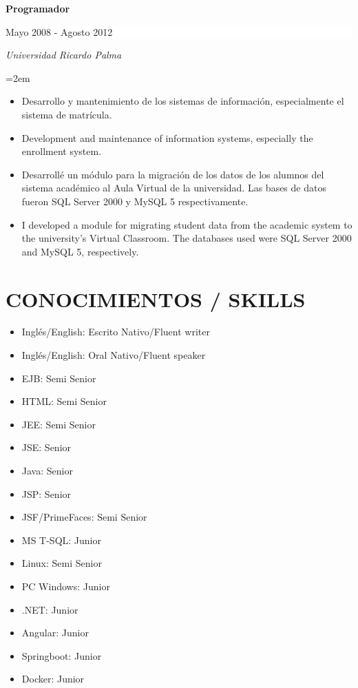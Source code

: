 \documentclass[paper=a4,fontsize=11pt]{scrartcl} %
\newcommand{\sepspace}{\vspace*{1em}}		%
\newcommand{\NewPart}[1]{\section*{\uppercase{#1}}}
\newcommand{\EducationEntry}[4]{
		\noindent \textbf{#1} \hfill      %
		\colorbox{White}{%
			\parbox{7cm}{%
			\hfill\color{Black}#2}} \par  %
		\noindent \textit{#3} \par        %
		\noindent\hangindent=2em\hangafter=0 \small #4 %
		\normalsize \par}
\begin{document}
\EducationEntry{Programador}{Mayo 2008 - Agosto 2012}{Universidad Ricardo Palma}{
\begin{itemize}
\item{Desarrollo y mantenimiento de los sistemas de información, especialmente el sistema de matrícula.}
\item{Development and maintenance of information systems, especially the enrollment system.}
\item{Desarrollé un módulo para la migración de los datos de los alumnos del sistema académico al Aula Virtual de la universidad. Las bases de datos fueron SQL Server 2000 y MySQL 5 respectivamente.}
\item{I developed a module for migrating student data from the academic system to the university's Virtual Classroom. The databases used were SQL Server 2000 and MySQL 5, respectively.}
\end{itemize}
}
\sepspace

\NewPart{Conocimientos / Skills}{}{}{
\begin{itemize}
\item{Inglés/English: Escrito Nativo/Fluent writer}
\item{Inglés/English: Oral Nativo/Fluent speaker}
\item{EJB: Semi Senior}
\item{HTML: Semi Senior}
\item{JEE: Semi Senior}
\item{JSE: Senior}
\item{Java: Senior}
\item{JSP:  Senior}
\item{JSF/PrimeFaces: Semi Senior}
\item{MS T-SQL: Junior}
\item{Linux: Semi Senior}
\item{PC Windows: Junior}
\item{.NET: Junior}
\item{Angular: Junior}
\item{Springboot: Junior}
\item{Docker: Junior}

\end{itemize}
}
\sepspace
\end{document}
